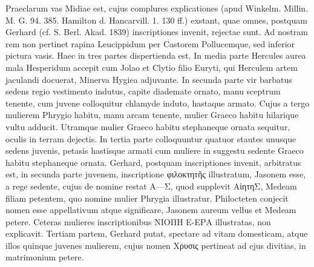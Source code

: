 \documentclass[landscape, a4paper, 11pt, oneside, polutonikogreek, german]{article}
\begin{document}
Praeclarum vas Midiae est, cujus complures explicationes (apud Winkelm. Millin. M. G. 94. 385. Hamilton d. Hancarvill. 1. 130 ff.) exstant, quae omnes, postquam Gerhard (cf. S. Berl. Akad. 1839) inscriptiones invenit, rejectae sunt. Ad nostram rem non pertinet rapina Leucippidum per Castorem Pollucemque, sed inferior pictura vasis. Haec in tres partes dispertienda est. In media parte Hercules aurea mala Hesperidum accepit cum Jolao et Clytio filio Euryti, qui Herculem artem jaculandi docuerat, Minerva Hygiea adjuvante. In secunda parte vir barbatus sedens regio vestimento indutus, capite diademate ornato, manu sceptrum tenente, cum juvene colloquitur chlamyde induto, hastaque armato. Cujus a tergo mulierem Phrygio habitu, manu arcam tenente, mulier Graeco habitu hilarique vultu adducit. Utramque mulier Graeco habitu stephaneque ornata sequitur, oculis in terram dejectis. In tertia parte colloquuntur quatuor stautes unusque sedens juvenis, petasis hastisque armati cum muliere in suggestu sedente Graeco habitu stephaneque ornata. Gerhard, postquam inscriptiones invenit, arbitratus est, in secunda parte juvenem, inscriptione φιλοκτητῆς illustratum, Jasonem esse, a rege sedente, cujus de nomine restat Α---Σ, quod supplevit ΑἰητηΣ, Medeam filiam petentem, quo nomine mulier Phrygia illustratur. Philocteten conjecit nomen esse appellativum atque significare, Jasonem aureum vellus et Medeam petere. Ceteras mulieres inscriptionibus ΝΙΟΠΗ Ε-ΕΡΑ illustratas, non explicavit. Tertiam partem, Gerhard putat, spectare ad vitam domesticam, atque illos quinque juvenes mulierem, cujus nomen Χρυσις pertineat ad ejus divitias, in matrimonium petere.
\end{document}
